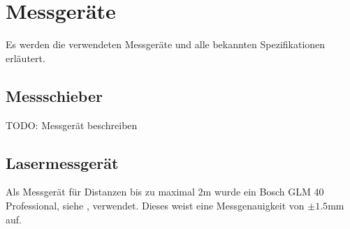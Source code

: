 \section{Messgeräte}\label{anhang:messung:messgeraete}
Es werden die verwendeten Messgeräte und alle bekannten Spezifikationen erläutert.

\subsection{Messschieber}
TODO: Messgerät beschreiben

\subsection{Lasermessgerät}

Als Messgerät für Distanzen bis zu maximal $2\si{\metre}$ wurde ein Bosch GLM 40 Professional, siehe \cite{bosch:glm40}, verwendet.
Dieses weist eine Messgenauigkeit von $\pm 1.5\si{\milli\metre}$ auf.
